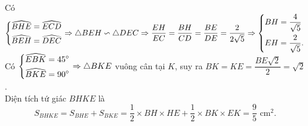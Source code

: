 \begin{ex}
{\begin{enumerate}
		Có $\left\{\begin{aligned}&\widehat{BHE}=\widehat{ECD}\\&\widehat{BEH}=\widehat{DEC}\end{aligned}\right.\Rightarrow\triangle BEH\backsim\triangle DEC\Rightarrow\dfrac{EH}{EC}=\dfrac{BH}{CD}=\dfrac{BE}{DE}=\dfrac{2}{2\sqrt{5}}\Rightarrow\left\{\begin{aligned}&BH=\dfrac{4}{\sqrt{5}}\\&EH=\dfrac{2}{\sqrt{5}}.\end{aligned}\right.$\\
		Có $\left\{\begin{aligned}&\widehat{EBK}=45^\circ\\&\widehat{BKE}=90^\circ\end{aligned}\right.\Rightarrow\triangle BKE$ vuông cân tại $K$, suy ra $BK=KE=\dfrac{BE\sqrt{2}}{2}=\sqrt{2}$.\\
		Diện tích tứ giác $BHKE$ là $$S_{BHKE}=S_{BHE}+S_{BKE}=\dfrac{1}{2}\times BH\times HE+\dfrac{1}{2}\times BK\times EK=\dfrac{9}{5}\text{ cm}^2.$$
\end{enumerate}}
\end{ex}
